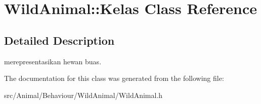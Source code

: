 \hypertarget{classWildAnimal_1_1Kelas}{\section{Wild\+Animal\+:\+:Kelas Class Reference}
\label{classWildAnimal_1_1Kelas}
}


\subsection{Detailed Description}
merepresentasikan hewan buas. 

The documentation for this class was generated from the following file\+:\begin{DoxyCompactItemize}
\item 
src/\+Animal/\+Behaviour/\+Wild\+Animal/Wild\+Animal.\+h\end{DoxyCompactItemize}
